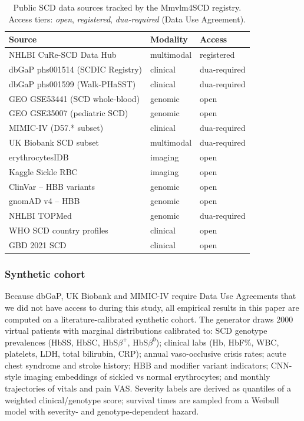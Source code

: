 \documentclass[11pt,a4paper]{article}
\begin{document}
\begin{table}[htbp]\centering
\caption{Public SCD data sources tracked by the Mmvlm4SCD registry. Access tiers: \textit{open}, \textit{registered}, \textit{dua-required} (Data Use Agreement).}\label{tab:registry}
\small
\begin{tabular}{p{6cm}ll}
\toprule
Source & Modality & Access \\
\midrule
NHLBI CuRe-SCD Data Hub & multimodal & registered \\
dbGaP phs001514 (SCDIC Registry) & clinical & dua-required \\
dbGaP phs001599 (Walk-PHaSST) & clinical & dua-required \\
GEO GSE53441 (SCD whole-blood) & genomic & open \\
GEO GSE35007 (pediatric SCD) & genomic & open \\
MIMIC-IV (D57.* subset) & clinical & dua-required \\
UK Biobank SCD subset & multimodal & dua-required \\
erythrocytesIDB & imaging & open \\
Kaggle Sickle RBC & imaging & open \\
ClinVar -- HBB variants & genomic & open \\
gnomAD v4 -- HBB & genomic & open \\
NHLBI TOPMed & genomic & dua-required \\
WHO SCD country profiles & clinical & open \\
GBD 2021 SCD & clinical & open \\
\bottomrule\end{tabular}\end{table}
\subsubsection{Synthetic cohort}
Because dbGaP, UK Biobank and MIMIC-IV require Data Use Agreements that we did not have access to during this study, all empirical results in this paper are computed on a literature-calibrated synthetic cohort. The generator draws 2000 virtual patients with marginal distributions calibrated to: SCD genotype prevalences (HbSS, HbSC, HbS$\beta^{+}$, HbS$\beta^{0}$); clinical labs (Hb, HbF\%, WBC, platelets, LDH, total bilirubin, CRP); annual vaso-occlusive crisis rates; acute chest syndrome and stroke history; HBB and modifier variant indicators; CNN-style imaging embeddings of sickled vs normal erythrocytes; and monthly trajectories of vitals and pain VAS. Severity labels are derived as quantiles of a weighted clinical/genotype score; survival times are sampled from a Weibull model with severity- and genotype-dependent hazard.
\end{document}
